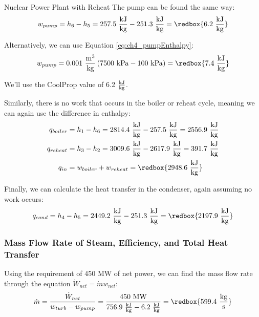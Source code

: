 \begin{example}[label=ex:ch4_supercrit]{Nuclear Power Plant with Reheat}
  The pump can be found the same way:
  \begin{equation*}
    w_{pump} = h_6 - h_5 = 257.5\ \frac{\rm kJ}{\rm kg} - 251.3\ \frac{\rm kJ}{\rm kg} = \redbox{6.2\ \frac{\rm kJ}{\rm kg}}
  \end{equation*}

  Alternatively, we can use Equation \ref{eq:ch4_pumpEnthalpy}:
  \begin{equation*}
    w_{pump} = 0.001\ \frac{\rm m^3}{\rm kg} \left(7500\ {\rm kPa} - 100\ {\rm kPa}\right) = \redbox{7.4\ \frac{\rm kJ}{\rm kg}}
  \end{equation*}

  We'll use the CoolProp value of 6.2 $\frac{\rm kJ}{\rm kg}$.
  
  Similarly, there is no work that occurs in the boiler or reheat cycle, meaning we can again use the difference in enthalpy:
  \begin{align*}
    q_{boiler} &= h_1 - h_6 = 2814.4\ \frac{\rm kJ}{\rm kg} - 257.5\ \frac{\rm kJ}{\rm kg} = 2556.9\ \frac{\rm kJ}{\rm kg} \\
    q_{reheat} &= h_3 - h_2 = 3009.6\ \frac{\rm kJ}{\rm kg} - 2617.9\ \frac{\rm kJ}{\rm kg} = 391.7\ \frac{\rm kJ}{\rm kg} \\
    q_{in} &= w_{boiler} + w_{reheat} = \redbox{2948.6\ \frac{\rm kJ}{\rm kg}}
  \end{align*}

  Finally, we can calculate the heat transfer in the condenser, again assuming no work occurs:
   \begin{equation*}
    q_{cond} = h_4 - h_5 = 2449.2\ \frac{\rm kJ}{\rm kg} - 251.3\ \frac{\rm kJ}{\rm kg} = \redbox{2197.9\ \frac{\rm kJ}{\rm kg}}
  \end{equation*}
  \subsubsection*{Mass Flow Rate of Steam, Efficiency, and Total Heat Transfer}
  Using the requirement of 450 MW of net power, we can find the mass flow rate through the equation $\dot{W}_{net} = \dot{m}w_{net}$:
  \begin{equation*}
    \dot{m} = \frac{\dot{W}_{net}}{w_{turb}-w_{pump}} = \frac{450\ \rm MW}{756.9\ \frac{\rm kJ}{\rm kg}-6.2\ \frac{\rm kJ}{\rm kg}} = \redbox{599.4\ \frac{\rm kg}{\rm s}}
  \end{equation*}


\end{example}
